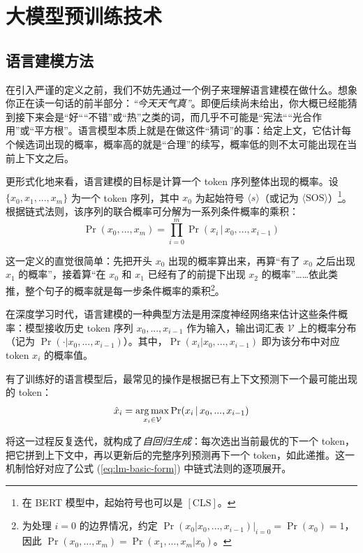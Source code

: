 \section{大模型预训练技术}


\subsection{语言建模方法}

在引入严谨的定义之前，我们不妨先通过一个例子来理解语言建模在做什么。想象你正在读一句话的前半部分：\textit{``今天天气真''}。即便后续尚未给出，你大概已经能猜到接下来会是``好````不错''或``热''之类的词，而几乎不可能是``宪法````光合作用''或``平方根''。语言模型本质上就是在做这件``猜词''的事：给定上文，它估计每个候选词出现的概率，概率高的就是``合理''的续写，概率低的则不太可能出现在当前上下文之后。

更形式化地来看，语言建模的目标是计算一个 token 序列整体出现的概率。设 $\{x_0,x_1,...,x_m\}$ 为一个 token 序列，其中 $x_0$ 为起始符号 $\langle s \rangle$（或记为 $\langle \mathrm{SOS} \rangle$）\footnote{在 BERT 模型中，起始符号也可以是 $[\mathrm{CLS}]$。}。根据链式法则，该序列的联合概率可分解为一系列条件概率的乘积：
\begin{equation}
\Pr(x_0,...,x_m) = \prod_{i=0}^{m} \Pr(x_{i}\,|\,x_0,...,x_{i-1})
\label{eq:lm-basic-form}
\end{equation}

这一定义的直觉很简单：先把开头 $x_0$ 出现的概率算出来，再算``有了 $x_0$ 之后出现 $x_1$ 的概率''，接着算``在 $x_0$ 和 $x_1$ 已经有了的前提下出现 $x_2$ 的概率''……依此类推，整个句子的概率就是每一步条件概率的乘积\footnote{为处理 $i=0$ 的边界情况，约定 $\Pr(x_0|x_0,...,x_{i-1})\big|_{i=0}=\Pr(x_0)=1$，因此 $\Pr(x_0,...,x_m) = \Pr(x_1,...,x_m|x_0)$。}。

在深度学习时代，语言建模的一种典型方法是用深度神经网络来估计这些条件概率：模型接收历史 token 序列 $x_0,...,x_{i-1}$ 作为输入，输出词汇表 $\mathcal{V}$ 上的概率分布（记为 $\Pr(\cdot|x_0,...,x_{i-1})$）。其中，$\Pr(x_i|x_0,...,x_{i-1})$ 即为该分布中对应 token $x_i$ 的概率值。

有了训练好的语言模型后，最常见的操作是根据已有上下文预测下一个最可能出现的 token：
\begin{equation}
\hat{x}_i = \operatorname*{arg\,max}_{x_i \in \mathcal{V}} \Pr(x_i\,|\,x_0,...,x_{i-1})
\end{equation}

将这一过程反复迭代，就构成了\emph{自回归生成}：每次选出当前最优的下一个 token，把它拼到上下文中，再以更新后的完整序列预测再下一个 token，如此递推。这一机制恰好对应了公式 (\ref{eq:lm-basic-form}) 中链式法则的逐项展开。

